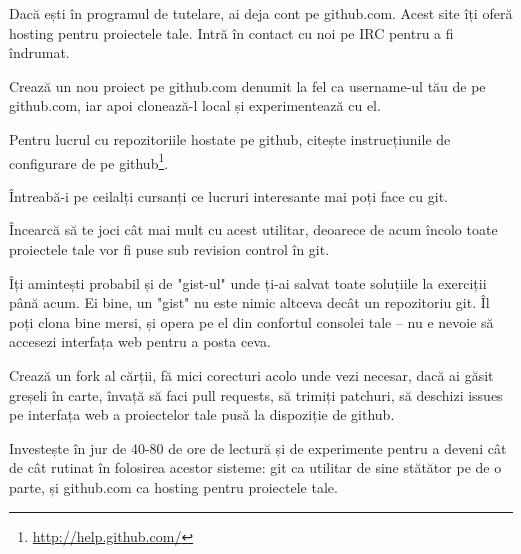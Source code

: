 \begin{Exercise}[title={A taste of git}]
Dacă ești în programul de tutelare, ai deja cont pe github.com.
Acest site îți oferă hosting pentru proiectele tale. Intră
în contact cu noi pe IRC pentru a fi îndrumat.

Crează un nou proiect pe github.com denumit la fel ca username-ul
tău de pe github.com, iar apoi clonează-l local și experimentează
cu el.

Pentru lucrul cu repozitoriile hostate pe github, citește instrucțiunile
de configurare de pe github\footnote{\url{http://help.github.com/}}.

Întreabă-i pe ceilalți cursanți ce lucruri interesante mai poți face
cu git.

Încearcă să te joci cât mai mult cu acest utilitar, deoarece de acum
încolo toate proiectele tale vor fi puse sub revision control în git.

Îți amintești probabil și de "gist-ul" unde ți-ai salvat toate soluțiile
la exerciții până acum. Ei bine, un "gist" nu este nimic altceva decât
un repozitoriu git. Îl poți clona bine mersi, și opera pe el
din confortul consolei tale -- nu e nevoie să accesezi interfața
web pentru a posta ceva.

Crează un fork al cărții, fă mici corecturi acolo unde vezi necesar,
dacă ai găsit greșeli în carte, învață să faci pull
requests, să trimiți patchuri, să deschizi issues pe interfața web
a proiectelor tale pusă la dispoziție de github.

Investește în jur de 40-80 de ore de lectură și de experimente pentru
a deveni cât de cât rutinat în folosirea acestor sisteme: git
ca utilitar de sine stătător pe de o parte, și github.com ca
hosting pentru proiectele tale.
\end{Exercise}
